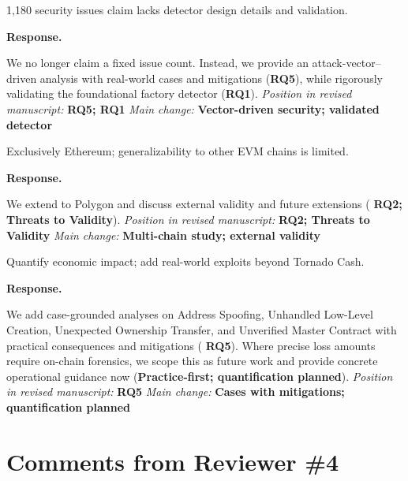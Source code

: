 \documentclass[acmsmall]{acmart}
\begin{document}
	\begin{tcolorbox}
		[commentbox,title=Reviewer \#3 -- Comment 4] 1,180 security issues claim lacks detector design
		details and validation.
	\end{tcolorbox}

	\noindent
	\textbf{Response.}

	We no longer claim a fixed issue count. Instead, we provide an attack-vector–driven analysis
	with real-world cases and mitigations ({\textbf{RQ5}}), while rigorously validating the foundational
factory detector ({\textbf{RQ1}}).
\noindent\textit{Position in revised manuscript:} {\color{red}\textbf{RQ5; RQ1}}
\noindent\textit{Main change:} {\color{blue}\textbf{Vector-driven security; validated detector}}

	\begin{tcolorbox}
		[commentbox,title=Reviewer \#3 -- Comment 5] Exclusively Ethereum; generalizability to other
		EVM chains is limited.
	\end{tcolorbox}

	\noindent
	\textbf{Response.}

	We extend to Polygon and discuss external validity and future extensions ( {\textbf{RQ2; Threats to Validity}}).
\noindent\textit{Position in revised manuscript:} {\color{red}\textbf{RQ2; Threats to Validity}}
\noindent\textit{Main change:} {\color{blue}\textbf{Multi-chain study; external validity}}

	\begin{tcolorbox}
		[commentbox,title=Reviewer \#3 -- Comment 6] Quantify economic impact; add real-world
		exploits beyond Tornado Cash.
	\end{tcolorbox}

	\noindent
	\textbf{Response.}

	We add case-grounded analyses on Address Spoofing, Unhandled Low-Level Creation, Unexpected
	Ownership Transfer, and Unverified Master Contract with practical consequences and mitigations (
	{\textbf{RQ5}}). Where precise loss amounts require on-chain forensics, we scope this as future
	work and provide concrete operational guidance now ({\textbf{Practice-first; quantification planned}}).
\noindent\textit{Position in revised manuscript:} {\color{red}\textbf{RQ5}}
\noindent\textit{Main change:} {\color{blue}\textbf{Cases with mitigations; quantification planned}}

	\newpage
	\section{Comments from Reviewer \#4}
\end{document}
